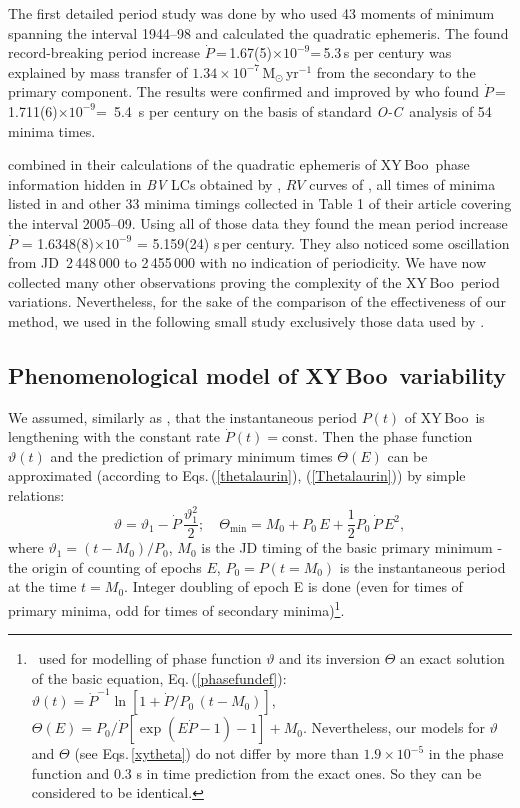\documentclass{aa}
\newcommand{\oc}{\textit{O-C}}
\newcommand{\w}{\citet{wilson14}}
\newcommand{\hvezda}{XY\,Boo}
\newcommand{\hzav}[1]{\left[#1\right]}
\begin{document}
The first detailed period study was done by \citet{mol} who used 43 moments of minimum spanning the interval 1944--98 and calculated the quadratic ephemeris. The found record-breaking period increase $\dot{P}$\,=\,1.67(5)$\times 10^{-9}$=\,5.3\,s per century was explained by mass transfer of $1.34\times 10^{-7}$\,M$_{\odot}$\,yr$^{-1}$ from the secondary to the primary component. The results were confirmed and improved by \citet{yang} who found $\dot{P}$\,=\,1.711(6)$\times 10^{-9}$=~5.4~s per century on the basis of standard \oc\ analysis of 54 minima times.

\citet{wilson14} combined in their calculations of the quadratic ephemeris of \hvezda\ phase information hidden in \textit{BV} LCs obtained by \citet{bin,winkler,awa}, $RV$ curves of \citet{lean}, all times of minima listed in \citet{yang} and other 33 minima timings collected in Table 1 of their article covering the interval 2005--09. Using all of those data they found the mean period increase $\dot{P}$ = 1.6348(8)$\times 10^{-9}$ = 5.159(24) s\,per century. They also noticed some oscillation from JD~2\,448\,000 to 2\,455\,000 with no indication of periodicity. We have now collected many other observations proving the complexity of the \hvezda\ period variations. Nevertheless, for the sake of the comparison of the effectiveness of our method, we used in the following small study exclusively those data used by \citet{wilson14}.

\subsection{Phenomenological model of \hvezda\ variability}\label{xymod}
We assumed, similarly as \citet{wilson14}, that the instantaneous period $P(t)$ of \hvezda\ is lengthening with the constant rate $\dot{P}(t)=\mathrm{const.}$ Then the phase function $\vartheta(t)$ and the prediction of primary minimum times $\mathit{\Theta}(E)$ can be approximated (according to Eqs.\,(\ref{thetalaurin}), (\ref{Thetalaurin})) by simple relations:
\begin{equation}
\vartheta=\vartheta_1-\dot{P}\,\frac{\vartheta_1^2}{2};\quad \label{xytheta}
\mathit{\Theta}_{\mathrm{min}}=M_0+P_0\,E+\textstyle{\frac{1}{2}}P_0\,\dot{P}\,E^2,
\end{equation}
where $\vartheta_1=(t-M_0)/P_0$, $M_0$ is the JD timing of the basic primary minimum - the origin of counting of epochs $E$, $P_0=P(t=M_0)$ is the instantaneous period at the time $t=M_0$. Integer doubling of epoch E  is done (even for times of primary minima, odd for times of secondary minima)\footnote{\w\ used for modelling of phase function $\vartheta$ and its inversion $\mathit{\Theta}$ an exact solution of the basic equation, Eq.\,(\ref{phasefundef}): $\vartheta(t)\!=\!\dot{P}^{-1}\ln \hzav{ 1+\dot{P}/P_0\,(t-M_0)}$, $\mathit{\Theta}(E)\!=\!P_0/\dot{P} \hzav{\exp(E \dot{P}-1)-1}+M_0$. Nevertheless, our models for $\vartheta$ and $\mathit{\Theta}$ (see Eqs.\,\ref{xytheta}) do not differ by more than $1.9\times10^{-5}$ in the phase function and 0.3 s in time prediction from the exact ones. So they can be considered to be identical.}.
\end{document}
